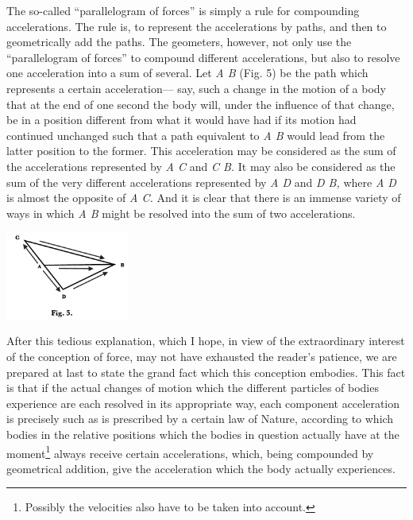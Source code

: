 \documentclass[]{article}
\newcounter{authornote}[page]
\newcommand{\authornote}[1]{\renewcommand{\thefootnote}{\fnsymbol{footnote}}\stepcounter{authornote}\footnote[\value{authornote}]{#1}\renewcommand{\thefootnote}{\arabic{footnote}}}
\begin{document}
The so-called ``parallelogram of forces'' is simply a rule for compounding accelerations. The rule is, to represent the accelerations by paths, and then to geometrically add the paths. The geometers, however, not only use the ``parallelogram of forces'' to compound different accelerations, but also to resolve one acceleration into a sum of several. Let \emph{A B} (Fig. 5) be the path which represents a certain acceleration--- say, such a change in the motion of a body that at the end of one second the body will, under the influence of that change, be in a position different from what it would have had if its motion had  continued unchanged such that a path equivalent to \emph{A B} would lead from the latter position to the former. This acceleration may be considered as the sum of the accelerations represented by \emph{A C} and \emph{C B.} It may also be considered as the sum of the very different accelerations represented by \emph{A D} and \emph{D B,} where \emph{A D} is almost the opposite of \emph{A C.} And it is clear that there is an immense variety of ways in which \emph{A B} might be resolved into the sum of two accelerations.

\centerline{\includegraphics[width=1.6in]{peirce-howto3.pdf}}

After this tedious explanation, which I hope, in view of the extraordinary interest of the conception of force, may not have exhausted the reader's patience, we are prepared at last to state the grand fact which this conception embodies. This fact is that if the actual changes of motion which the different particles of bodies experience are each resolved in its appropriate way, each component acceleration is precisely such as is prescribed by a certain law of Nature, according to which bodies in the relative positions which the bodies in question actually have at the moment\authornote{Possibly the velocities also have to be taken into account.} always receive certain accelerations, which, being compounded by geometrical addition, give the acceleration which the body actually experiences.
\end{document}
